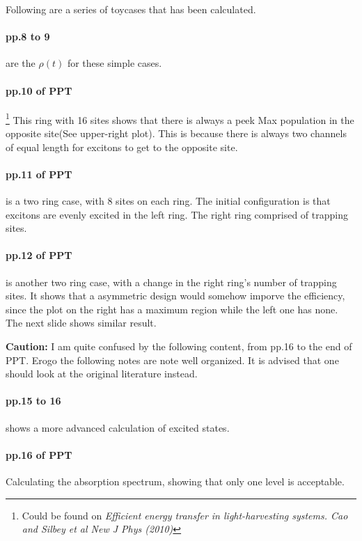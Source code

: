 \documentclass{article}
\numberwithin{equation}{subsection} %
\theoremstyle{definition}
\begin{document}
Following are a series of toycases that has been calculated.

\paragraph{pp.8 to 9} are the $\rho(t)$ for these simple cases.

\paragraph{pp.10 of PPT}
\footnote{Could be found on \textit{Efficient energy transfer in 
light-harvesting systems. Cao and Silbey et al New J Phys (2010)}}
This ring with 16 sites shows that there is always 
a peek Max population in the opposite site(See upper-right plot). This is
because there is always
two channels of equal length for excitons to get to the opposite site.

\paragraph{pp.11 of PPT} is 
a two ring case, with 8 sites on each ring. The initial configuration
is that excitons are evenly excited in the left ring. 
The right ring comprised of trapping sites.

\paragraph{pp.12 of PPT} is 
another two ring case, with a change in the right ring's number
of trapping sites. It shows that a asymmetric design would somehow
imporve the efficiency, since the plot on the right has a maximum region
while the left one has none. The next slide shows similar result.

\textbf{Caution:} I am quite confused by the following content,
from pp.16 to the end of PPT. Erogo the
following notes are note well organized. It is advised that one should
look at the original literature instead.

\paragraph{pp.15 to 16} shows a more advanced calculation of excited
states.

\paragraph{pp.16 of PPT} Calculating the absorption spectrum, 
showing that only one level is acceptable.
\end{document}
